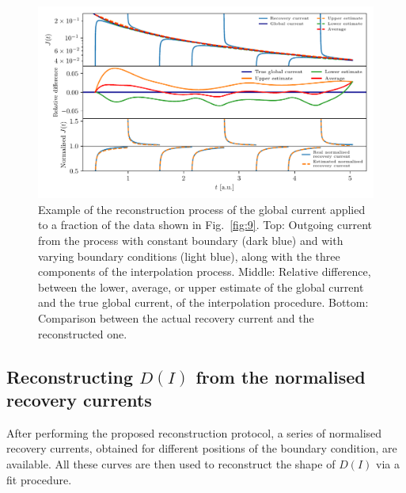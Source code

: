 \begin{figure}[!ht]
    \centering    
    \includegraphics[width=\textwidth]{4_probing_the_diffusive_behavior/figs/final/the_interpolation.pdf}
    \caption{Example of the reconstruction process of the global current applied to a fraction of the data shown in Fig.~\ref{fig:9}. Top: Outgoing current from the process with constant boundary (dark blue) and with varying boundary conditions (light blue), along with the three components of the interpolation process. Middle: Relative difference, between the lower, average, or upper estimate of the global current and the true global current, of the interpolation procedure. Bottom: Comparison between the actual recovery current and the reconstructed one.}
    \label{fig:protocol}
\end{figure}


\subsection{Reconstructing $D(I)$ from the normalised recovery currents}


After performing the proposed reconstruction protocol, a series of normalised recovery currents, obtained for different positions of the boundary condition, are available. All these curves are then used to reconstruct the shape of $D(I)$ via a fit procedure.

